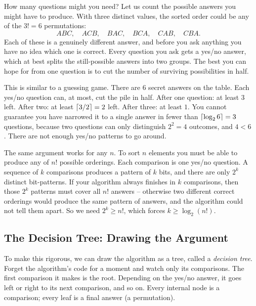 How many questions might you need? Let us count the possible answers you might
have to produce. With three distinct values, the sorted order could be any of
the $3! = 6$ permutations:
\[
ABC,\quad ACB,\quad BAC,\quad BCA,\quad CAB,\quad CBA.
\]
Each of these is a genuinely different answer, and before you ask anything you
have no idea which one is correct. Every question you ask gets a yes/no answer,
which at best splits the still-possible answers into two groups. The best you
can hope for from one question is to cut the number of surviving possibilities
in half.

\begin{intuitionbox}
This is similar to a guessing game. There are $6$ secret answers on the table. Each
yes/no question can, at most, cut the pile in half. After one question: at
least $3$ left. After two: at least $\lceil3/2\rceil = 2$ left. After three: at
least $1$. You cannot guarantee you have narrowed it to a single answer in
fewer than $\lceil\log_2 6\rceil = 3$ questions, because two questions can only
distinguish $2^2 = 4$ outcomes, and $4 < 6$. There are not enough
yes/no patterns to go around.
\end{intuitionbox}

The same argument works for any $n$. To sort $n$ elements you must be
able to produce any of $n!$ possible orderings. Each comparison is one yes/no
question. A sequence of $k$ comparisons produces a pattern of $k$ bits, and
there are only $2^k$ distinct bit-patterns. If your algorithm always finishes
in $k$ comparisons, then those $2^k$ patterns must cover all $n!$ answers --
otherwise two different correct orderings would produce the same pattern of
answers, and the algorithm could not tell them apart. So we need
$2^k \ge n!$, which forces $k \ge \log_2(n!)$.

\subsection{The Decision Tree: Drawing the Argument}

To make this rigorous, we can draw the algorithm as a tree, called a \emph{decision tree}. Forget the algorithm's code for a moment and watch only
its comparisons. The first comparison it makes is the root. Depending on the
yes/no answer, it goes left or right to its next comparison, and so on. Every
internal node is a comparison; every leaf is a final answer (a permutation).

